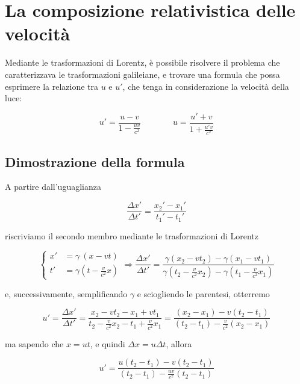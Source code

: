 \documentclass{article}
\begin{document}
\section{La composizione relativistica delle velocità}
Mediante le trasformazioni di Lorentz, è possibile risolvere il
problema che caratterizzava le trasformazioni galileiane, e trovare
una formula che possa esprimere la relazione tra \(u\) e \(u'\),
che tenga in considerazione la velocità della luce:

\begin{equation}
    u' = \frac{u - v}{1 - \frac{uv}{c^2}}\ \ \ \ \ \ \ \ \ \ \ \ \ \ \ \ \ u = \frac{u' + v}{1 + \frac{u'v}{c^2}} %
\end{equation}

\subsection{Dimostrazione della formula}
A partire dall'uguaglianza

\begin{equation}
    \frac{\Delta x'}{\Delta t'} = \frac{x_2' - x_1'}{t_1' - t_1'}
\end{equation}

riscriviamo il secondo membro mediante le trasformazioni di Lorentz

\begin{equation}
    \left\{
        \begin{aligned}
        x' &= \gamma\ (x - vt) \\
        t' &= \gamma \left(t - \frac{v}{c^2} x\right)
        \end{aligned}
    \right.
    \Rightarrow
    \frac{\Delta x'}{\Delta t'} = \frac{\gamma(x_2 - vt_2) - \gamma(x_1 - vt_1)}{\gamma(t_2 - \frac{v}{c^2} x_2) - \gamma(t_1 - \frac{v}{c^2} x_1)}
\end{equation}

e, successivamente, semplificando \(\gamma\) e sciogliendo le parentesi, otterremo

\begin{equation}
    u' = \frac{\Delta x'}{\Delta t'} = \frac{x_2 - vt_2 - x_1 + vt_1}{t_2 - \frac{v}{c^2} x_2 - t_1 + \frac{v}{c^2} x_1} = \frac{(x_2 - x_1) - v(t_2 - t_1)}{(t_2 - t_1) - \frac{v}{c^2}(x_2 - x_1)}
\end{equation}

ma sapendo che \(x = ut\), e quindi \(\Delta x = u \Delta t\), allora

\begin{equation}
    u' = \frac{u(t_2 - t_1) - v(t_2 - t_1)}{(t_2 - t_1)-\frac{uv}{c^2}(t_2 - t_1)}
\end{equation}
\end{document}
